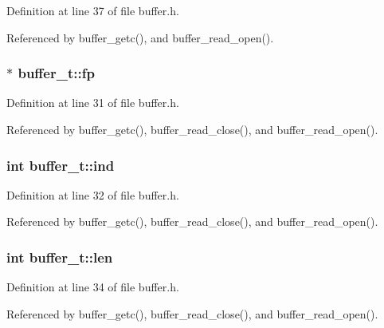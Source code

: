 Definition at line 37 of file buffer.\+h.



Referenced by buffer\+\_\+getc(), and buffer\+\_\+read\+\_\+open().

\subsubsection[{\texorpdfstring{fp}{fp}}]{$\ast$ buffer\+\_\+t\+::fp}\hypertarget{structbuffer__t_a00a55014e0827223c41b1b1d56e5be5d}{}\label{structbuffer__t_a00a55014e0827223c41b1b1d56e5be5d}


Definition at line 31 of file buffer.\+h.



Referenced by buffer\+\_\+getc(), buffer\+\_\+read\+\_\+close(), and buffer\+\_\+read\+\_\+open().

\subsubsection[{\texorpdfstring{ind}{ind}}]{\setlength{\rightskip}{0pt plus 5cm}int buffer\+\_\+t\+::ind}\hypertarget{structbuffer__t_a59ea992e5006ead050862bae5c41670a}{}\label{structbuffer__t_a59ea992e5006ead050862bae5c41670a}


Definition at line 32 of file buffer.\+h.



Referenced by buffer\+\_\+getc(), buffer\+\_\+read\+\_\+close(), and buffer\+\_\+read\+\_\+open().

\subsubsection[{\texorpdfstring{len}{len}}]{\setlength{\rightskip}{0pt plus 5cm}int buffer\+\_\+t\+::len}\hypertarget{structbuffer__t_a0b67fc6880d331ae05dab0e58a4584c2}{}\label{structbuffer__t_a0b67fc6880d331ae05dab0e58a4584c2}


Definition at line 34 of file buffer.\+h.



Referenced by buffer\+\_\+getc(), buffer\+\_\+read\+\_\+close(), and buffer\+\_\+read\+\_\+open().


